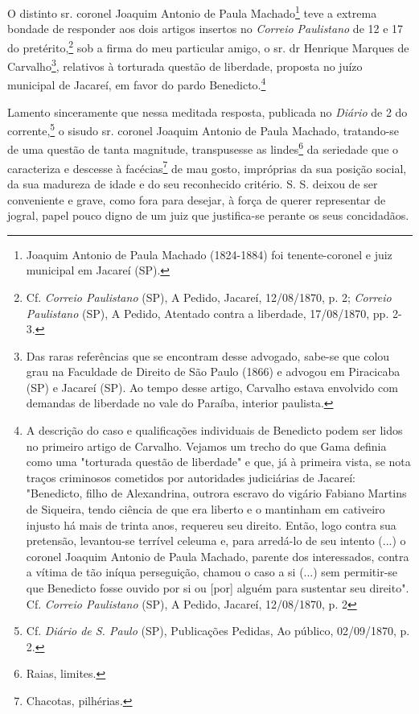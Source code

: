 O distinto sr. coronel Joaquim Antonio de Paula Machado\footnote{
  Joaquim Antonio de Paula Machado (1824-1884) foi tenente-coronel e
  juiz municipal em Jacareí (SP).} teve a extrema bondade de responder
aos dois artigos insertos no \emph{Correio Paulistano} de 12 e 17 do
pretérito,\footnote{Cf. \emph{Correio Paulistano} (SP), A Pedido,
  Jacareí, 12/08/1870, p. 2; \emph{Correio Paulistano} (SP), A Pedido,
  Atentado contra a liberdade, 17/08/1870, pp. 2-3.} sob a firma do meu
particular amigo, o sr. dr Henrique Marques de Carvalho\footnote{Das
  raras referências que se encontram desse advogado, sabe-se que colou
  grau na Faculdade de Direito de São Paulo (1866) e advogou em
  Piracicaba (SP) e Jacareí (SP). Ao tempo desse artigo, Carvalho estava
  envolvido com demandas de liberdade no vale do Paraíba, interior
  paulista.}, relativos à torturada questão de liberdade, proposta no
juízo municipal de Jacareí, em favor do pardo Benedicto.\footnote{A
  descrição do caso e qualificações individuais de Benedicto podem ser
  lidos no primeiro artigo de Carvalho. Vejamos um trecho do que Gama
  definia como uma "torturada questão de liberdade" e que, já à primeira
  vista, se nota traços criminosos cometidos por autoridades judiciárias
  de Jacareí: "Benedicto, filho de Alexandrina, outrora escravo do
  vigário Fabiano Martins de Siqueira, tendo ciência de que era liberto
  e o mantinham em cativeiro injusto há mais de trinta anos, requereu
  seu direito. Então, logo contra sua pretensão, levantou-se terrível
  celeuma e, para arredá-lo de seu intento (...) o coronel Joaquim
  Antonio de Paula Machado, parente dos interessados, contra a vítima de
  tão iníqua perseguição, chamou o caso a si (...) sem permitir-se que
  Benedicto fosse ouvido por si ou {[}por{]} alguém para sustentar seu
  direito". Cf. \emph{Correio Paulistano} (SP), A Pedido, Jacareí,
  12/08/1870, p. 2}

Lamento sinceramente que nessa meditada resposta, publicada no
\emph{Diário} de 2 do corrente,\footnote{Cf. \emph{Diário de S. Paulo}
  (SP), Publicações Pedidas, Ao público, 02/09/1870, p. 2.} o sisudo sr.
coronel Joaquim Antonio de Paula Machado, tratando-se de uma questão de
tanta magnitude, transpusesse as lindes\footnote{Raias, limites.} da
seriedade que o caracteriza e descesse à facécias\footnote{Chacotas,
  pilhérias.} de mau gosto, impróprias da sua posição social, da sua
madureza de idade e do seu reconhecido critério. S. S. deixou de ser
conveniente e grave, como fora para desejar, à força de querer
representar de jogral, papel pouco digno de um juiz que justifica-se
perante os seus concidadãos.

